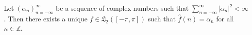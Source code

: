 Let $(\alpha_n)_{n=-\infty}^{\infty}$ be a sequence of complex numbers such that $\sum_{n=-\infty}^{\infty} |\alpha_n|^2 < \infty$. Then there exists a unique $f \in \mathfrak{L}_2([-\pi, \pi])$ such that $\hat{f}(n) = \alpha_n$ for all $n \in \mathbb{Z}$.
